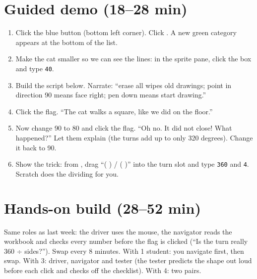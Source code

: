 \section{Guided demo (18--28 min)}
\begin{workedexample}
\par\noindent\begin{minipage}[t]{0.56\linewidth}
\begin{enumerate}[leftmargin=1.4em,itemsep=1pt]
  \item Click the blue  button (bottom left corner). Click . A new green  category appears at the bottom of the list.
  \item Make the cat smaller so we can see the lines: in the sprite pane, click the  box and type \texttt{40}.
  \item Build the script below. Narrate: \enquote{erase all wipes old drawings; point in direction 90 means face right; pen down means start drawing.}
  \item Click the flag. \enquote{The cat walks a square, like we did on the floor.}
  \item Now change 90 to 80 and click the flag. \enquote{Oh no. It did not close! What happened?} Let them explain (the turns add up to only 320 degrees). Change it back to 90.
  \item Show the trick: from , drag \enquote{( ) / ( )} into the turn slot and type \texttt{360} and \texttt{4}. Scratch does the dividing for you.
\end{enumerate}
\end{minipage}\hfill
\begin{minipage}[t]{0.40\linewidth}\vspace{4pt}\centering
\begin{scratch}[scale=0.78]
\end{scratch}
\end{minipage}

\end{workedexample}

\section{Hands-on build (28--52 min)}
\begin{pairroles}
Same roles as last week: the driver uses the mouse, the navigator reads the workbook and checks every number before the flag is clicked (\enquote{Is the turn really 360 ÷ sides?}). Swap every 8 minutes. With 1 student: you navigate first, then swap. With 3: driver, navigator and tester (the tester predicts the shape out loud before each click and checks off the checklist). With 4: two pairs.
\end{pairroles}

